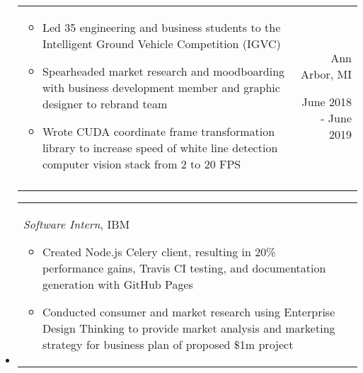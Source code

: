 \documentclass[9pt]{memoir}
\begin{document}
\begin{itemize}
\begin{tabular}[t]{lr}
\begin{minipage}[t]{0.7 \textwidth}
\small

\begin{itemize}
    \item Led 35 engineering and business students to the Intelligent Ground
          Vehicle Competition (IGVC)
    \item Spearheaded market research and moodboarding with business development
          member and graphic designer to rebrand team
    \item Wrote CUDA coordinate frame transformation library to increase speed
          of white line detection computer vision stack from 2 to 20 FPS
\end{itemize}

\end{minipage}

&

\begin{minipage}[t]{0.2 \textwidth}
\raggedleft

\normalsize
Ann Arbor, MI

\small
June 2018 - June 2019
\end{minipage}

\\ \\

\end{tabular}

\item

\begin{tabular}[t]{lr}

\begin{minipage}[t]{0.7 \textwidth}
\raggedright

\normalsize
\textit{Software Intern}, IBM

\small

\begin{itemize}
\item Created Node.js Celery client, resulting in 20\% performance gains, Travis
      CI testing, and documentation generation with GitHub Pages
\item Conducted consumer and market research using Enterprise Design Thinking to
      provide market analysis and marketing strategy for business plan of
      proposed \$1m project
\end{itemize}

\end{minipage}

&

\begin{minipage}[t]{0.2 \textwidth}
\raggedleft


\end{minipage}
\end{tabular}
\end{itemize}
\end{document}
